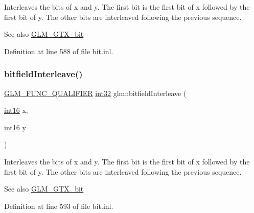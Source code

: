 Interleaves the bits of x and y. The first bit is the first bit of x followed by the first bit of y. The other bits are interleaved following the previous sequence.

\begin{DoxySeeAlso}{See also}
\hyperlink{group__gtx__bit}{G\+L\+M\+\_\+\+G\+T\+X\+\_\+bit} 
\end{DoxySeeAlso}


Definition at line 588 of file bit.\+inl.

\mbox{\label{group__gtx__bit_ga1a0264598647ae00a596865af4e1e878}} 
\subsubsection{\texorpdfstring{bitfield\+Interleave()}{bitfieldInterleave()}\hspace{0.1cm}{\footnotesize\ttfamily [3/16]}}
{\footnotesize\ttfamily \hyperlink{setup_8hpp_a33fdea6f91c5f834105f7415e2a64407}{G\+L\+M\+\_\+\+F\+U\+N\+C\+\_\+\+Q\+U\+A\+L\+I\+F\+I\+ER} \hyperlink{group__gtc__type__precision_ga632d8b25f6b61659f39ea4321fab92a4}{int32} glm\+::bitfield\+Interleave (\begin{DoxyParamCaption}\item[{\hyperlink{group__gtc__type__precision_ga2945a61d12771f8954994fcddf02b021}{int16}}]{x,  }\item[{\hyperlink{group__gtc__type__precision_ga2945a61d12771f8954994fcddf02b021}{int16}}]{y }\end{DoxyParamCaption})}

Interleaves the bits of x and y. The first bit is the first bit of x followed by the first bit of y. The other bits are interleaved following the previous sequence.

\begin{DoxySeeAlso}{See also}
\hyperlink{group__gtx__bit}{G\+L\+M\+\_\+\+G\+T\+X\+\_\+bit} 
\end{DoxySeeAlso}


Definition at line 593 of file bit.\+inl.

\mbox{\label{group__gtx__bit_ga19ef8360379483e3ee245e89cb62ff93}} 
